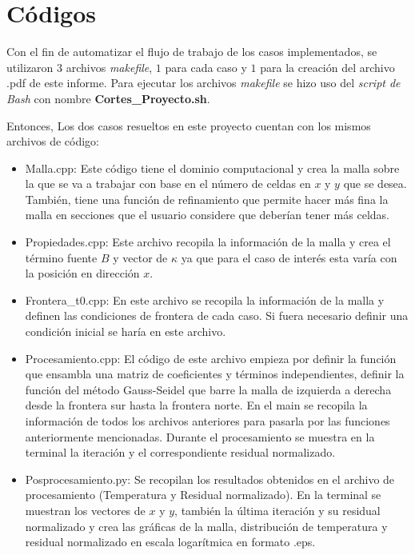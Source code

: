 \documentclass[article,latterpaper]{IEEEtran}
\begin{document}
\section{Códigos}
Con el fin de automatizar el flujo de trabajo de los casos implementados, se utilizaron $3$ archivos \textit{makefile}, $1$ para cada caso y $1$ para la creación del archivo .pdf de este informe. Para ejecutar los archivos \textit{makefile} se hizo uso del \textit{script de Bash} con nombre \textbf{Cortes\_Proyecto.sh}. 

Entonces, Los dos casos resueltos en este proyecto cuentan con los mismos archivos de código:

\begin{itemize}
	\item Malla.cpp: Este código tiene el dominio computacional y crea la malla sobre la que se va a trabajar con base en el número de celdas en $x$ y $y$ que se desea. También, tiene una función de refinamiento que permite hacer más fina la malla en secciones que el usuario considere que deberían tener más celdas.
	\item Propiedades.cpp: Este archivo recopila la información de la malla y crea el término fuente $B$ y vector de $\kappa$ ya que para el caso de interés esta varía con la posición en dirección $x$.
	\item Frontera\_t0.cpp: En este archivo se recopila la información de la malla y definen las condiciones de frontera de cada caso. Si fuera necesario definir una condición inicial se haría en este archivo.
	\item Procesamiento.cpp: El código de este archivo empieza por definir la función que ensambla una matriz de coeficientes y términos independientes, definir la función del método Gauss-Seidel que barre la malla de izquierda a derecha desde la frontera sur hasta la frontera norte. En el main se recopila la información de todos los archivos anteriores para pasarla por las funciones anteriormente mencionadas. Durante el procesamiento se muestra en la terminal la iteración y el correspondiente residual normalizado.
	\item Posprocesamiento.py: Se recopilan los resultados obtenidos en el archivo de procesamiento (Temperatura y Residual normalizado). En la terminal se muestran los vectores de $x$ y $y$, también la última iteración y su residual normalizado y crea las gráficas de la malla, distribución de temperatura y residual normalizado en escala logarítmica en formato .eps.
\end{itemize}
	
\end{document}
